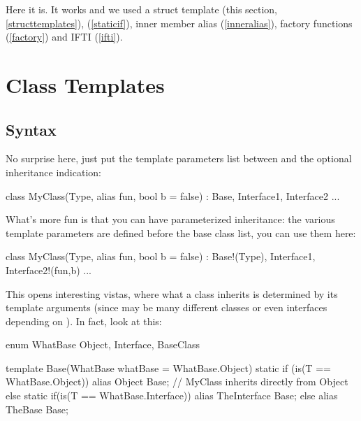 Here it is. It works and we used a struct template (this section, \ref{structtemplates}),  (\ref{staticif}), inner member alias (\ref{inneralias}), factory functions (\ref{factory}) and IFTI (\ref{ifti}).

\section{Class Templates}\label{classtemplates}


\subsection{Syntax}\label{classsyntax}

No surprise here, just put the template parameters list between  and the optional inheritance indication:

\begin{dcode}
class MyClass(Type, alias fun, bool b = false)
    : Base, Interface1, Interface2
{ ... }
\end{dcode}

What's more fun is that you can have parameterized inheritance: the various template parameters are defined before the base class list, you can use them here:

\begin{dcode}
class MyClass(Type, alias fun, bool b = false)
    : Base!(Type), Interface1, Interface2!(fun,b)
{ ... }
\end{dcode}


This opens interesting vistas, where what a class inherits is determined by its template arguments (since  may be many different classes or even interfaces depending on ). In fact, look at this:

\begin{dcode}
enum WhatBase { Object, Interface, BaseClass }

template Base(WhatBase whatBase = WhatBase.Object)
{
    static if (is(T == WhatBase.Object))
        alias Object Base; // MyClass inherits directly from Object
    else static if(is(T == WhatBase.Interface))
        alias TheInterface Base;
    else
        alias TheBase Base;
}
\end{dcode}


